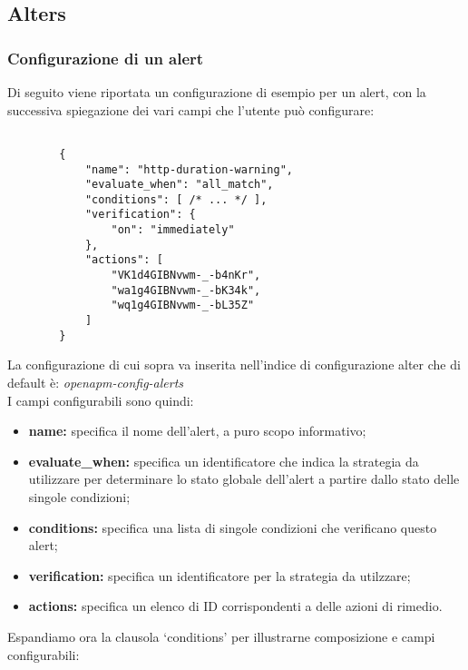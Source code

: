 \subsection{Alters}

	\subsubsection{Configurazione di un alert}

	
	Di seguito viene riportata un configurazione di esempio per un alert, con la successiva spiegazione dei vari campi che l'utente può configurare:

	\begin{lstlisting}[style=json]

		{
			"name": "http-duration-warning",
			"evaluate_when": "all_match",
			"conditions": [ /* ... */ ],
			"verification": {
				"on": "immediately"
			},
			"actions": [
				"VK1d4GIBNvwm-_-b4nKr",
				"wa1g4GIBNvwm-_-bK34k",
				"wq1g4GIBNvwm-_-bL35Z"
			]
		}
	\end{lstlisting}

	La configurazione di cui sopra va inserita nell'indice di configurazione alter che di default è: \textit{openapm-config-alerts} \\
	I campi configurabili sono quindi:

	\begin{itemize}
                \item \textbf{name:} specifica il nome dell'alert, a puro scopo informativo;
                \item \textbf{evaluate\_when:} specifica un identificatore che indica la strategia da utilizzare per determinare lo stato globale dell'alert a partire dallo stato delle singole condizioni;
                \item \textbf{conditions:} specifica una lista di singole condizioni che verificano questo alert;
                \item \textbf{verification:} specifica un identificatore per la strategia da utilzzare;
                \item \textbf{actions:} specifica un elenco di ID corrispondenti a delle azioni di rimedio.
	\end{itemize}

	\newpage


	Espandiamo ora la clausola `conditions' per illustrarne composizione e campi configurabili:

